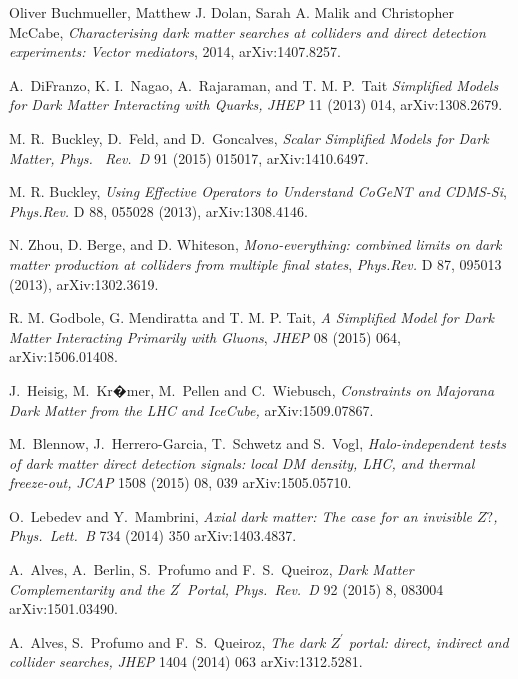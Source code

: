  Oliver Buchmueller, Matthew J. Dolan, Sarah A. Malik and Christopher McCabe, \emph{Characterising dark matter searches at colliders and direct detection experiments: Vector mediators}, 2014, arXiv:1407.8257.

 A.~DiFranzo, K. I.~Nagao, A.~Rajaraman, and T. M. P.~Tait
\emph{Simplified Models for Dark Matter Interacting with Quarks,}
\emph{JHEP} 11 (2013) 014, arXiv:1308.2679.

 M. R.~Buckley, D.~Feld, and D.~Goncalves,
\emph{Scalar Simplified Models for Dark Matter,}
\emph{Phys. \ Rev.\ D} 91 (2015) 015017,
arXiv:1410.6497.


 M. R. Buckley, \emph{Using Effective Operators to Understand CoGeNT and CDMS-Si}, \emph{Phys.Rev.} D 88, 055028 (2013), arXiv:1308.4146.

 N. Zhou, D. Berge, and D. Whiteson, \emph{Mono-everything: combined limits on dark matter production at colliders from multiple final states}, \emph{Phys.Rev.} D 87, 095013 (2013), arXiv:1302.3619.

 R. M. Godbole, G. Mendiratta and T. M. P. Tait, \emph{A Simplified Model for Dark Matter Interacting Primarily with Gluons}, \emph{JHEP} 08 (2015) 064, arXiv:1506.01408.

 J.~Heisig, M.~Kr�mer, M.~Pellen and C.~Wiebusch,
\emph{Constraints on Majorana Dark Matter from the LHC and IceCube,}
  arXiv:1509.07867. %

 M.~Blennow, J.~Herrero-Garcia, T.~Schwetz and S.~Vogl,
\emph{Halo-independent tests of dark matter direct detection signals: local DM density, LHC, and thermal freeze-out,}
  \emph{JCAP} 1508 (2015) 08,  039
  arXiv:1505.05710. %

 O.~Lebedev and Y.~Mambrini,
\emph{Axial dark matter: The case for an invisible $Z?$,}
  \emph{Phys.\ Lett.\ B} 734 (2014) 350
  arXiv:1403.4837. %

 A.~Alves, A.~Berlin, S.~Profumo and F.~S.~Queiroz,
\emph{Dark Matter Complementarity and the Z$^\prime$ Portal,}
  \emph{Phys.\ Rev.\ D} 92 (2015) 8,  083004
  arXiv:1501.03490. %

 A.~Alves, S.~Profumo and F.~S.~Queiroz,
\emph{The dark $Z^{'}$ portal: direct, indirect and collider searches,}
  \emph{JHEP} 1404 (2014) 063
  arXiv:1312.5281. %

